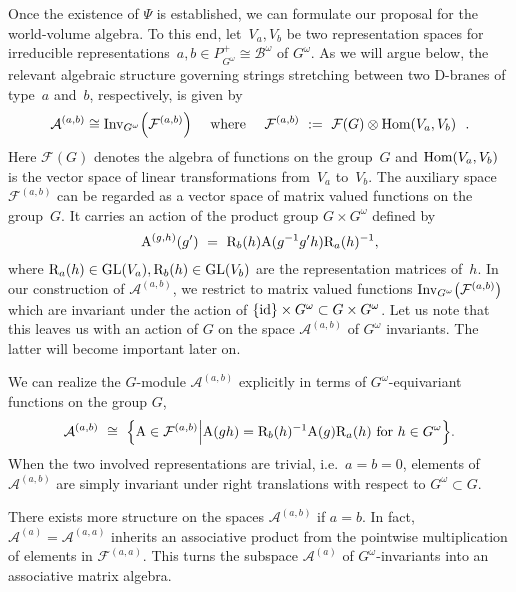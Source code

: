 \documentclass[12pt,a4paper]{article}
\newcommand{\GL}{{\text{GL}}}
\newcommand{\mc}{\mathcal} %
\def\Inv{\text{\rm Inv}}
\def\Iso{\Psi}
\def\iG{G^\omega} %
\def\bL{\mc{B}} %
\def\reps{P^+} %
\def\treps{\bL^\omega} %
\def\Hom{{\text{\rm Hom}}} %
\def\tR{{\rm R}} %
\def\tA{{\rm A}}
\def\id{{\rm id}}
\begin{document}
Once the existence of $\Iso$ is established, we can 
formulate our proposal for the world-volume algebra. To this 
end, let~$V_a,V_b$ be two representation spaces for irreducible
representations~$a,b\in\reps_{\iG}\cong\treps$ of $\iG$. As we
will argue below, the relevant algebraic structure governing 
strings stretching between two D-branes of type~$a$ and~$b$,
respectively, is given by 
\begin{equation}
  \label{eq:DBraneModule}
  \mc{A}^{(a,b)}\cong  \Inv_{\iG}\Bigl(\mc{F}^{(a,b)}\Bigr) \ \ \
  \text{ where } \ \ \ 
  \mc{F}^{(a,b)}\ :=\ \mc{F}(G)\otimes \Hom(V_a,V_b)\ \ .
\end{equation}
Here $\mc{F}(G)$ denotes the algebra of functions on the group~$G$
and $\Hom(V_a,V_b)$ is the vector space of linear transformations 
from~$V_a$ to~$V_b$. The auxiliary space $\mc{F}^{(a,b)}$ can be 
regarded as a vector space of matrix valued functions on the 
group~$G$. It carries an action of the product group $G\times\iG$
defined by 
\begin{equation}
  \tA^{(g,h)}(g^\prime) \ =\ \tR_b(h)\tA(g^{-1}g^\prime h)
  \tR_a(h)^{-1},
\end{equation}
where $\tR_a(h)\in\GL(V_a),\tR_b(h)\in\GL(V_b)$ are 
the representation matrices of~$h$. In our construction of 
$\mc{A}^{(a,b)}$, we restrict to matrix valued functions
$\Inv_{\iG}\bigl(\mc{F}^{(a,b)}\bigr)$
which are invariant under the action of $\{\id\}\times\iG\subset G \times \iG$.
Let us note that this leaves us with an action of $G$ on the space
$\mc{A}^{(a,b)}$ of $\iG$ invariants.
The latter will become important later on. 
\smallskip

We can realize the $G$-module $\mc{A}^{(a,b)}$ explicitly in terms 
of $\iG$-equivariant functions on the group $G$, 
\begin{equation}
\label{eq:BraneAlgebra}
  \mc{A}^{(a,b)}
  \ \cong\ \Bigl\{ \tA \in \mc{F}^{(a,b)} \Bigl|
   \tA(gh)=\tR_b(h)^{-1}\tA(g)\tR_a(h)\text{ for }h\in \iG\Bigr\}.
\end{equation}
When the two involved representations are trivial, i.e.\ $a=b=0$,
elements of $\mc{A}^{(a,b)}$ are simply invariant under right 
translations with respect to $\iG\subset G$.
\smallskip

There exists more structure on the spaces $\mc{A}^{(a,b)}$ if 
$a=b$. In fact, $\mc{A}^{(a)} = \mc{A}^{(a,a)}$ inherits an 
associative product from the pointwise multiplication of elements 
in $\mc{F}^{(a,a)}$. This turns the subspace $\mc{A}^{(a)}$   
of $\iG$-invariants into an associative matrix algebra. 
\smallskip 
\end{document}
